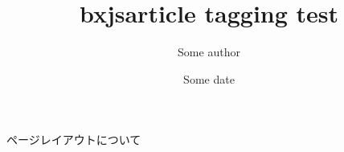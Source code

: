 \documentclass[b5paper,9pt,lualatex,ja=standard]{bxjsarticle}
\title{bxjsarticle tagging test}
\author{Some author}
\date{Some date}
\begin{document}
ページレイアウトについて
\end{document}
